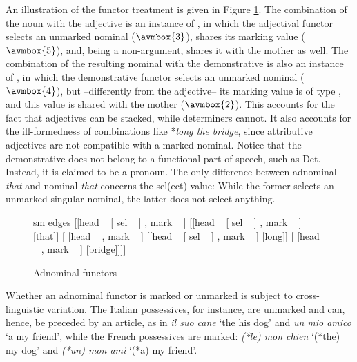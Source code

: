\documentclass[output=paper]{langsci/langscibook}
\begin{document}
An illustration of the functor treatment is given in Figure \ref{markyy}. 
The combination of the noun with the adjective is an instance of , 
in which the adjectival functor selects an unmarked nominal ($\avmbox{3}$),  
shares its {\sc marking} value ($\avmbox{5}$), and, being a non-argument, 
shares it with the mother as well. 
The combination of the resulting nominal with the demonstrative is also 
an instance of ,
in which the demonstrative functor selects an unmarked nominal ($\avmbox{4}$), 
but --differently from the adjective-- its {\sc marking} value is of type 
, and this value is shared with the mother ($\avmbox{2}$).    
This accounts for the fact that adjectives can be stacked, while  
determiners cannot. It also accounts for the ill-formedness of combinations like 
*\emph{long the bridge}, since attributive adjectives are not compatible with a
marked nominal.  
Notice that the demonstrative does not belong to a functional part of speech, such as Det.
Instead, it is claimed to be a pronoun. The only difference between adnominal \emph{that} and nominal
\emph{that} concerns the {\sc sel(ect)} value: While the former selects an unmarked singular nominal, 
the latter does not select anything.      

\begin{figure}
	\centering
	\begin{forest}
sm edges
[{[{\sc head} ~  [ {\sc sel} ~ ] , {\sc mark} ~  ]}
	[{[{\sc head} ~ [ {\sc sel} ~ ] , {\sc mark} ~ ]} [that]]
	[{ [{\sc head} ~  , {\sc mark} ~  ]}
		[{[{\sc head} ~ [ {\sc sel} ~ ] , {\sc mark} ~ ]} [long]]
		[{ [{\sc head} ~  , {\sc mark} ~ ]} [bridge]]]]
	\end{forest}
	\caption{\label{markyy} Adnominal functors}
\end{figure}

Whether an adnominal functor is marked or unmarked is subject to cross-linguistic variation. 
The Italian possessives, for instance, are unmarked and can, hence, be preceded 
by an article, as in \emph{il suo cane} `the his dog' and \emph{un mio amico} `a my friend', 
while the French possessives are marked: \emph{(*le) mon chien} `(*the) my dog' 
and \emph{(*un) mon ami} `(*a) my friend'. 
\end{document}
